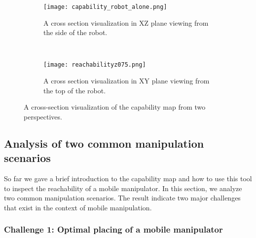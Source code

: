 \begin{figure}[!htbp]
    \centering
    \begin{subfigure}[b]{0.45\textwidth}
        \texttt{[image: capability\_robot\_alone.png]}
        \caption{A cross section visualization in XZ plane viewing from the side of the robot. }
        \label{fig:cmap_view1}
    \end{subfigure}
    ~ %
    \begin{subfigure}[b]{0.45\textwidth}
        \texttt{[image: reachabilityz075.png]}
        \caption{A cross section visualization in XY plane viewing from the top of the robot. }
        \label{fig:cmap_view2}
    \end{subfigure}
    \caption{ A cross-section visualization of the capability map from two perspectives. }\label{fig:cmap_view}
\end{figure}



\subsection{Analysis of two common manipulation scenarios}
So far we gave a brief introduction to the capability map and how to use this tool to inspect the reachability of a mobile manipulator. In this section, we analyze two common manipulation scenarios. The result indicate two major challenges that exist in the context of mobile manipulation.  

\subsubsection{Challenge 1: Optimal placing of a mobile manipulator}

